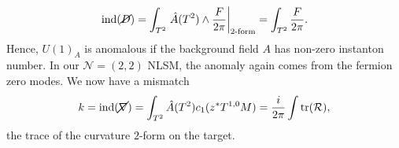 \begin{equation}
  \text{ind}(\cancel{D}) = \int_{T^2} \left.\hat{A}(T^2) \wedge \frac{F}{2 \pi} \right\rvert_{\text{2-form}} = \int_{T^2} \frac{F}{2 \pi}.
\end{equation}
Hence, $U(1)_A$ is anomalous if the background field $A$ has non-zero instanton number.
In our $\mathcal{N} = (2, 2)$ NLSM, the anomaly again comes from the fermion zero modes.
We now have a mismatch
\begin{equation}
  k = \text{ind}(\cancel{\nabla}) = \int_{T^2} \hat{A} (T^2) c_1 (z^* T^{1, 0} M) = \frac{i}{2 \pi} \int \tr(\mathcal{R}),
\end{equation}
the trace of the curvature $2$-form on the target.
